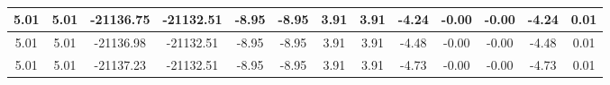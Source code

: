 \begin{table}[htbp]
\begin{adjustbox}{angle=90}
\begin{tabular}{|c|c|c|c|c|c|c|c|c|c|c|c|c|}
 5.01 & 5.01 & -21136.75 & -21132.51 & -8.95 & -8.95 & 3.91 & 3.91 & -4.24 & -0.00 & -0.00 & -4.24 & 0.01\\ \hline
 5.01 & 5.01 & -21136.98 & -21132.51 & -8.95 & -8.95 & 3.91 & 3.91 & -4.48 & -0.00 & -0.00 & -4.48 & 0.01\\ \hline
 5.01 & 5.01 & -21137.23 & -21132.51 & -8.95 & -8.95 & 3.91 & 3.91 & -4.73 & -0.00 & -0.00 & -4.73 & 0.01\\ \hline
            \end{tabular}
        \end{adjustbox}
        \caption{}
        \label{}
    \end{table}
    